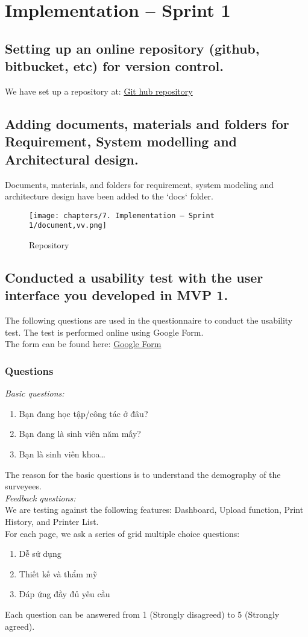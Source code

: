 \section{Implementation – Sprint 1}

\subsection{Setting up an online repository (github, bitbucket, etc) for version control.}

We have set up a repository at: \href{https://github.com/hoangvvo/CO3001-SmartStudentPrintingService}{Git hub repository}
\subsection{Adding documents, materials and folders for Requirement, System modelling and Architectural design.}
Documents, materials, and folders for requirement, system modeling and architecture design have been added to the `docs` folder.
\begin{figure}[H]
    \texttt{[image: chapters/7. Implementation – Sprint 1/document,vv.png]}
    \caption{Repository}%
\end{figure}

\subsection{Conducted a usability test with the user interface you developed in MVP 1.}
The following questions are used in the questionnaire to conduct the usability test. The test is performed online using Google Form.\\
The form can be found here: \href{https://forms.gle/c92x9Q3QJvYeMsRH6}{Google Form}
\subsubsection{Questions}
\textit{Basic questions:}
\begin{enumerate}
    \item Bạn đang học tập/công tác ở đâu?
    \item Bạn đang là sinh viên năm mấy?
    \item Bạn là sinh viên khoa…
\end{enumerate}
\indent \indent The reason for the basic questions is to understand the demography of the surveyees.\\
\indent \textit{Feedback questions:}\\
\indent \indent We are testing against the following features: Dashboard, Upload function, Print History, and Printer List.\\
\indent \indent For each page, we ask a series of grid multiple choice questions:
\begin{enumerate}
    \item Dễ sử dụng
    \item Thiết kế và thẩm mỹ
    \item Đáp ứng đầy đủ yêu cầu
\end{enumerate}
\indent \indent Each question can be answered from 1 (Strongly disagreed) to 5 (Strongly agreed).
